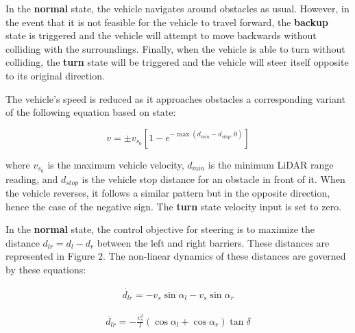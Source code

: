 \documentclass[conference]{IEEEtran}
\begin{document}
In the \textbf{normal} state, the vehicle navigates around obstacles as usual. However, in the event that it is not feasible for the vehicle to travel forward, the \textbf{backup} state is triggered and the vehicle will attempt to move backwards without colliding with the surroundings. Finally, when the vehicle is able to turn without colliding, the \textbf{turn} state will be triggered and the vehicle will steer itself opposite to its original direction. 


The vehicle's speed is reduced as it approaches obstacles a corresponding variant of the following equation based on state: 

\begin{equation}
    v = \pm v_{s_0}\left[1-e^{-\max(d_{min}-d_{stop},0)}\right]
\end{equation}

where $v_{s_0}$ is the maximum vehicle velocity, $d_{min}$ is the minimum LiDAR range reading, and $d_{stop}$ is the vehicle stop distance for an obstacle in front of it. When the vehicle reverses, it follows a similar pattern but in the opposite direction, hence the case of the negative sign. The \textbf{turn} state velocity input is set to zero. 

In the \textbf{normal} state, the control objective for steering is to maximize the distance $d_{lr} = d_l - d_r$ between the left and right barriers. These distances are represented in Figure 2. The non-linear dynamics of these distances are governed by these equations:


\begin{equation}
    \begin{aligned}
        \dot{d_{lr}} = -v_s \sin \alpha_l - v_s \sin \alpha_r
    \end{aligned}
\end{equation}  

\begin{equation}
    \begin{aligned}
        \ddot{d_{lr}} = -\frac{v_s^2}{l} (\cos \alpha_l + \cos \alpha_r)\tan \delta 
    \end{aligned}
\end{equation}
\end{document}
